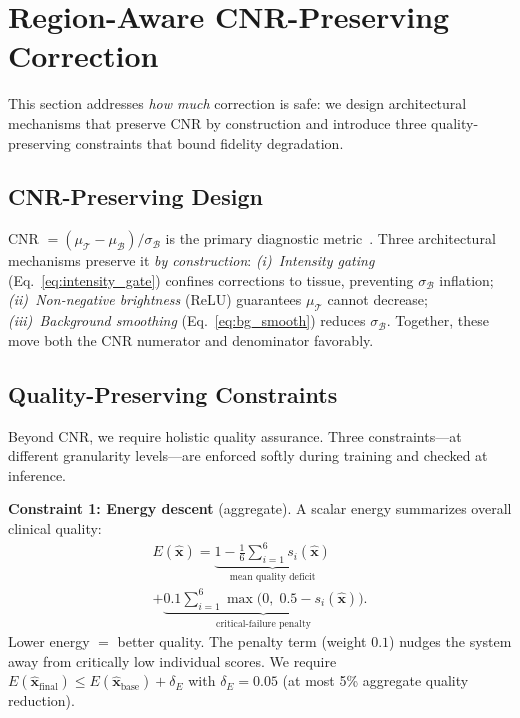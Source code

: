 \documentclass[journal,twoside,web]{ieeecolor}
\begin{document}
\section{Region-Aware CNR-Preserving Correction}
\label{sec:cnr}

This section addresses \emph{how much} correction is safe: we design architectural mechanisms that preserve CNR by construction and introduce three quality-preserving constraints that bound fidelity degradation.

\subsection{CNR-Preserving Design}
\label{sec:cnr_design}
CNR $= (\mu_\mathcal{T} - \mu_\mathcal{B})/\sigma_\mathcal{B}$ is the primary diagnostic metric~\cite{rodriguez2020generalized}. Three architectural mechanisms preserve it \emph{by construction}: \emph{(i)~Intensity gating} (Eq.~\eqref{eq:intensity_gate}) confines corrections to tissue, preventing $\sigma_\mathcal{B}$ inflation; \emph{(ii)~Non-negative brightness} (ReLU) guarantees $\mu_\mathcal{T}$ cannot decrease; \emph{(iii)~Background smoothing} (Eq.~\eqref{eq:bg_smooth}) reduces $\sigma_\mathcal{B}$. Together, these move both the CNR numerator and denominator favorably.

\subsection{Quality-Preserving Constraints}
\label{sec:formal}
Beyond CNR, we require holistic quality assurance. Three constraints---at different granularity levels---are enforced softly during training and checked at inference.

\textbf{Constraint 1: Energy descent} (aggregate). A scalar energy summarizes overall clinical quality:
\begin{multline}
E(\hat{\mathbf{x}}) = \underbrace{1 - \frac{1}{6}\sum_{i=1}^{6} s_i(\hat{\mathbf{x}})}_{\text{mean quality deficit}} \\
+ \underbrace{0.1 \sum_{i=1}^{6} \max\!\big(0,\; 0.5 - s_i(\hat{\mathbf{x}})\big)}_{\text{critical-failure penalty}}.
\label{eq:energy}
\end{multline}
Lower energy $=$ better quality. The penalty term (weight $0.1$) nudges the system away from critically low individual scores. We require $E(\hat{\mathbf{x}}_\text{final}) \leq E(\hat{\mathbf{x}}_\text{base}) + \delta_E$ with $\delta_E = 0.05$ (at most 5\% aggregate quality reduction).
\end{document}
